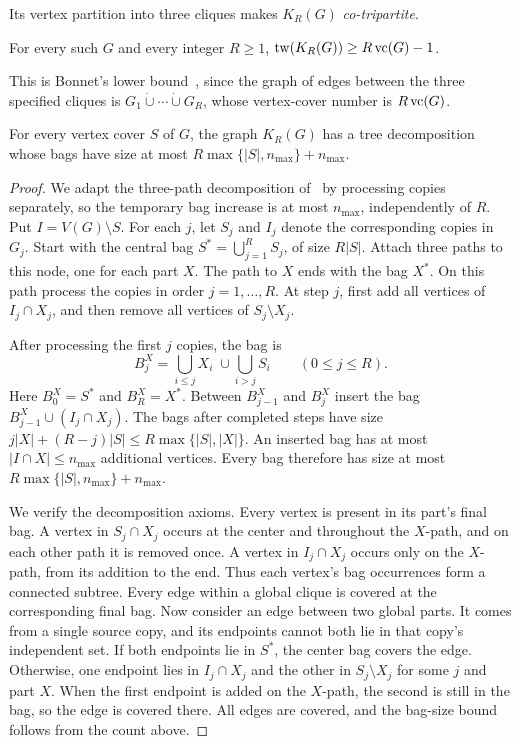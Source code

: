 Its vertex partition into three cliques makes $K_R(G)$
\emph{co-tripartite}.

\begin{lemma}\label{lem:tw-central-bag}
For every such $G$ and every integer $R\geq1$,
$\operatorname{tw}(K_R(G))\geq R\operatorname{vc}(G)-1$.
\end{lemma}

This is Bonnet's lower bound~\cite[Lemma~6]{BonnetTreewidth}, since
the graph of edges between the three specified cliques is
$G_1\mathbin{\dot\cup}\cdots\mathbin{\dot\cup}G_R$, whose vertex-cover
number is $R\operatorname{vc}(G)$.

\begin{lemma}\label{lem:tw-cover-decomposition}
For every vertex cover $S$ of $G$, the graph $K_R(G)$ has a tree
decomposition whose bags have size at most $R\max\{|S|,n_{\max}\}+n_{\max}$.
\end{lemma}

\begin{proof}
We adapt the three-path decomposition of~\cite[Section~3.3]{BonnetTreewidth}
by processing copies separately, so the temporary bag increase is at
most $n_{\max}$, independently of $R$.
Put $I=V(G)\setminus S$.
For each $j$, let $S_j$ and $I_j$ denote the corresponding copies
in $G_j$. Start with the central bag
$S^*=\bigcup_{j=1}^R S_j$, of size $R|S|$. Attach three paths to this
node, one for each part $X$. The path to $X$ ends with the bag $X^*$.
On this path process the copies in order $j=1,\ldots,R$. At step $j$,
first add all vertices of $I_j\cap X_j$, and then remove all vertices
of $S_j\setminus X_j$.

After processing the first $j$ copies, the bag is
\[
 B^X_j=\bigcup_{i\le j}X_i\;\cup\!\bigcup_{i>j}S_i
 \qquad(0\le j\le R).
\]
Here $B^X_0=S^*$ and $B^X_R=X^*$. Between $B^X_{j-1}$ and
$B^X_j$ insert the bag $B^X_{j-1}\cup(I_j\cap X_j)$.
The bags after completed steps have size
$j|X|+(R-j)|S|\le R\max\{|S|,|X|\}$. An inserted bag has at most
$|I\cap X|\le n_{\max}$ additional vertices. Every bag therefore has
size at most $R\max\{|S|,n_{\max}\}+n_{\max}$.

We verify the decomposition axioms. Every vertex is present in its
part's final bag. A vertex in $S_j\cap X_j$ occurs at the center and
throughout the $X$-path, and on each other path it is removed once.
A vertex in $I_j\cap X_j$ occurs only on the $X$-path, from its
addition to the end. Thus each vertex's bag occurrences form a
connected subtree. Every edge within a global clique is covered at
the corresponding final bag. Now consider an edge between two global
parts. It comes from a single source copy, and its endpoints cannot
both lie in that copy's independent set. If both endpoints lie in
$S^*$, the center bag covers the edge. Otherwise, one endpoint lies
in $I_j\cap X_j$ and the other in $S_j\setminus X_j$ for some $j$
and part $X$. When the first endpoint is added on the $X$-path, the
second is still in the bag, so the edge is covered there. All edges
are covered, and the bag-size bound follows from the count above.
\end{proof}

